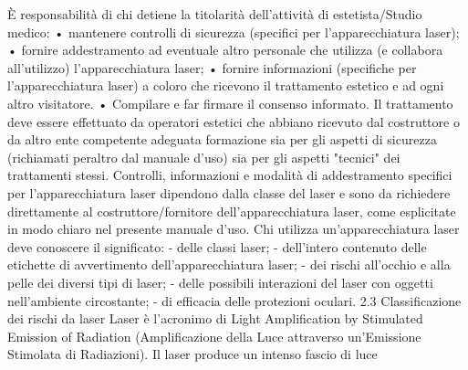 \documentclass[10pt]{article}
\begin{document}
È responsabilità di chi detiene la titolarità dell'attività di estetista/Studio medico: • mantenere controlli di sicurezza (specifici per l'apparecchiatura laser); • fornire addestramento ad eventuale altro personale che utilizza (e collabora all'utilizzo) l'apparecchiatura laser; • fornire informazioni (specifiche per l'apparecchiatura laser) a coloro che ricevono il trattamento estetico e ad ogni altro visitatore. • Compilare e far firmare il consenso informato. Il trattamento deve essere effettuato da operatori estetici che abbiano ricevuto dal costruttore o da altro ente competente adeguata formazione sia per gli aspetti di sicurezza (richiamati peraltro dal manuale d'uso) sia per gli aspetti "tecnici" dei trattamenti stessi. Controlli, informazioni e modalità di addestramento specifici per l'apparecchiatura laser dipendono dalla classe del laser e sono da richiedere direttamente al costruttore/fornitore dell'apparecchiatura laser, come esplicitate in modo chiaro nel presente manuale d'uso. Chi utilizza un'apparecchiatura laser deve conoscere il significato: - delle classi laser; - dell'intero contenuto delle etichette di avvertimento dell'apparecchiatura laser; - dei rischi all'occhio e alla pelle dei diversi tipi di laser; - delle possibili interazioni del laser con oggetti nell'ambiente circostante; - di efficacia delle protezioni oculari. 2.3 Classificazione dei rischi da laser Laser è l'acronimo di Light Amplification by Stimulated Emission of Radiation (Amplificazione della Luce attraverso un'Emissione Stimolata di Radiazioni). Il laser produce un intenso fascio di luce\\
\end{document}
